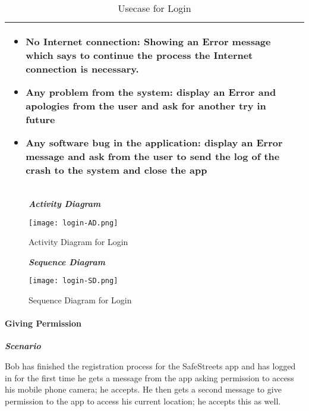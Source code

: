 \begin{table}[H]
\begin{tabulary}{\textwidth}{|J|J|}
\begin{minipage}[t]{0.8\textwidth}
\begin{itemize}
\item No Internet connection: Showing an Error message which says to continue the process the Internet connection is necessary.
\item Any problem from the system: display an Error and apologies from the user and ask for another try in future
\item Any software bug in the application: display an Error message and ask from the user to send the log of the crash to the system and close the app
\end{itemize}
\end{minipage}\\
\hline
\end{tabulary}
\caption{\label{tab:Usecase-Login}Usecase for Login}
\end{table}

\begin{figure}[H]
\begin{flushleft}\emph{\textbf{Activity Diagram}}\end{flushleft}
\caption{Activity Diagram for Login}
\label{fig:SD-login}
\centering
\texttt{[image: login-AD.png]}
\end{figure}

\begin{figure}[H]
\begin{flushleft}\emph{\textbf{Sequence Diagram}}\end{flushleft}
\caption{Sequence Diagram for Login}
\label{fig:SD-login}
\centering
\texttt{[image: login-SD.png]}
\end{figure}

\paragraph{Giving Permission}
\hfill \break

\begin{flushleft}\emph{\textbf{Scenario}}\end{flushleft}

Bob has finished the registration process for the SafeStreets app and has logged in for the first time he gets a message from the app asking permission to access his mobile phone camera; he accepts. He then gets a second message to give permission to the app to access his current location; he accepts this as well.


